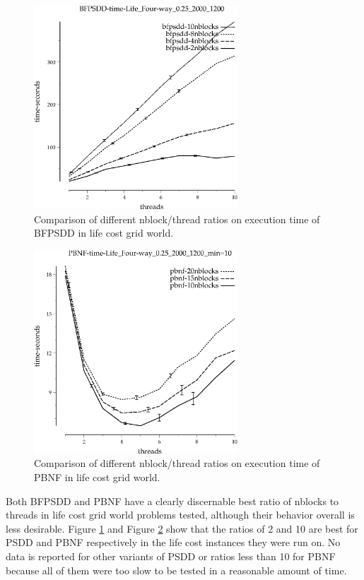 \documentclass{article}
\begin{document}
\begin{figure}[h!]
\includegraphics[width=3in]{../graphs/grid_life_four-way_0.25_2000_1200/BFPSDD-time-Life_Four-way_0.25_2000_1200.eps}
\caption{Comparison of different nblock/thread ratios on execution time of BFPSDD in life cost grid world.}
\label{fig:BFPSDD-nblock-life}
\end{figure}

\begin{figure}[h!]
\includegraphics[width=3in]{../graphs/grid_life_four-way_0.25_2000_1200/PBNF-time-Life_Four-way_0.25_2000_1200_min=10.eps}
\caption{Comparison of different nblock/thread ratios on execution time of PBNF in life cost grid world.}
\label{fig:PBNF-nblock-life}
\end{figure}

Both BFPSDD and PBNF have a clearly discernable best ratio of nblocks to threads in life cost grid world problems tested, although their behavior overall is less desirable. Figure \ref{fig:BFPSDD-nblock-life} and Figure  \ref{fig:PBNF-nblock-life} show that the ratios of 2 and 10 are best for PSDD and PBNF respectively in the life cost instances they were run on. No data is reported for other variants of PSDD or ratios less than 10 for PBNF because all of them were too slow to be tested in a reasonable amount of time.
\end{document}
